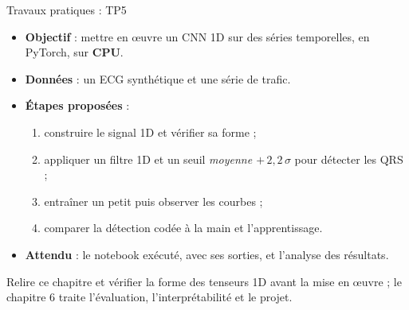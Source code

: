 \begin{frame}{Travaux pratiques : TP5}
\begin{abox}
\begin{itemize}
  \item \textbf{Objectif} : mettre en \oe{}uvre un CNN 1D sur des séries
  temporelles, en PyTorch, sur \textbf{CPU}.
  \item \textbf{Données} : un ECG synthétique et une série de trafic.
  \item \textbf{Étapes proposées} :
  \begin{enumerate}
    \item construire le signal 1D et vérifier sa forme  ;
    \item appliquer un filtre 1D et un seuil \emph{moyenne $+\,2{,}2\,\sigma$}
    pour détecter les QRS ;
    \item entraîner un petit  puis observer les courbes ;
    \item comparer la détection codée à la main et l'apprentissage.
  \end{enumerate}
  \item \textbf{Attendu} : le notebook exécuté, avec ses sorties, et l'analyse
  des résultats.
\end{itemize}
\end{abox}
\begin{kbox}
Relire ce chapitre et vérifier la forme des tenseurs 1D avant la mise en
\oe{}uvre ; le chapitre 6 traite l'évaluation, l'interprétabilité et le projet.
\end{kbox}
\end{frame}